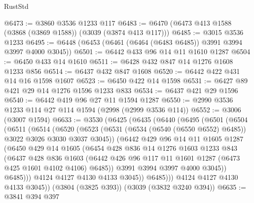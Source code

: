 \begin{lexlean}{RustStd}
\begin{coremodule}
@6473 := @3860 @3536 @1233 @117
@6483 := @6470 (@6473 @413 @1588 (@3868 (@3869 @1588)) (@3039 (@3874 @413 @117)))
@6485 := @3015 @3536 @1233
@6495 := @6448 (@6453 (@6461 (@6464 (@6483 @6485)) @3991 @3994 @3997 @4000 @3045))
@6501 := @6442 @433 @96 @14 @11 @1610 @1287
@6504 := @6450 @433 @14 @1610
@6511 := @6428 @432 @847 @14 @1276 @1608 @1233 @856
@6514 := @6437 @432 @847 @1608
@6520 := @6442 @422 @431 @14 @16 @1598 @1607
@6523 := @6450 @422 @14 @1598
@6531 := @6427 @89 @421 @29 @14 @1276 @1596 @1233 @833
@6534 := @6437 @421 @29 @1596
@6540 := @6442 @419 @96 @27 @11 @1594 @1287
@6550 := @2990 @3536 @1233 @114 @27 @114 @1594 (@2998 (@2999 @3536 @114))
@6552 := @3006 (@3007 @1594)
@6633 := @3530
    (@6425
      (@6435
        (@6440
          (@6495
            (@6501
              (@6504
                (@6511
                  (@6514
                    (@6520
                      (@6523
                        (@6531 (@6534 (@6540 (@6550 @6552) @6485)) @3022 @3026 @3030 @3037 @3045))
                      (@6442
                        @429
                        @96
                        @14
                        @11
                        @1605
                        @1287
                        (@6450
                          @429
                          @14
                          @1605
                          (@6454
                            @428
                            @836
                            @14
                            @1276
                            @1603
                            @1233
                            @843
                            (@6437
                              @428
                              @836
                              @1603
                              (@6442
                                @426
                                @96
                                @117
                                @11
                                @1601
                                @1287
                                (@6473 @425 @1601 @4102 @4106)
                                @6485))
                            @3991
                            @3994
                            @3997
                            @4000
                            @3045))
                        @6485)))
                  @4124
                  @4127
                  @4130
                  @4133
                  @3045))
              @6485)))
        @4124
        @4127
        @4130
        @4133
        @3045))
    (@3804 (@3825 @393))
    (@3039 (@3832 @3240 @394))
@6635 := @3841 @394 @397

\end{coremodule}
\end{lexlean}
